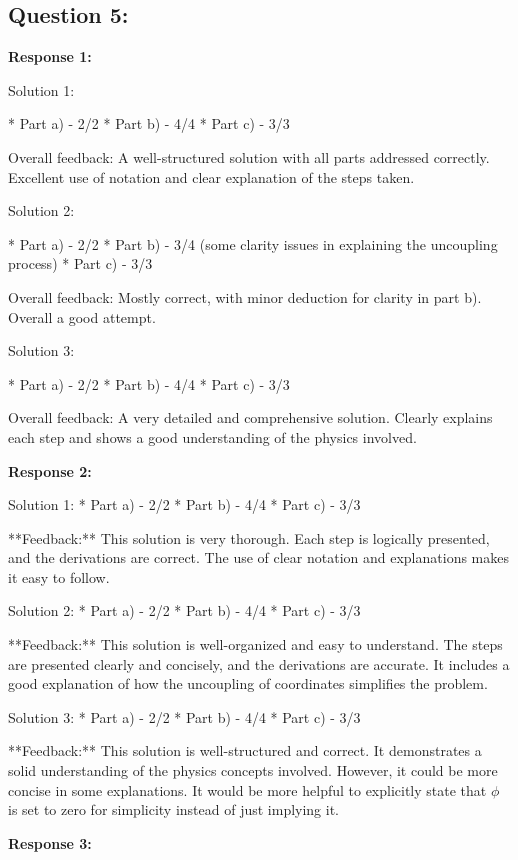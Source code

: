 \documentclass[a4paper,11pt]{article}
\begin{document}
\subsection*{Question 5:}

\textbf{Response 1:}

Solution 1:

*   Part a) - 2/2
*   Part b) - 4/4
*   Part c) - 3/3

Overall feedback: A well-structured solution with all parts addressed correctly. Excellent use of notation and clear explanation of the steps taken.

Solution 2:

*   Part a) - 2/2
*   Part b) - 3/4 (some clarity issues in explaining the uncoupling process)
*   Part c) - 3/3

Overall feedback: Mostly correct, with minor deduction for clarity in part b). Overall a good attempt.

Solution 3:

*   Part a) - 2/2
*   Part b) - 4/4
*   Part c) - 3/3

Overall feedback: A very detailed and comprehensive solution. Clearly explains each step and shows a good understanding of the physics involved.

\bigskip    
\textbf{Response 2:}

Solution 1:
*   Part a) - 2/2
*   Part b) - 4/4
*   Part c) - 3/3

**Feedback:** This solution is very thorough. Each step is logically presented, and the derivations are correct. The use of clear notation and explanations makes it easy to follow.

Solution 2:
*   Part a) - 2/2
*   Part b) - 4/4
*   Part c) - 3/3

**Feedback:** This solution is well-organized and easy to understand. The steps are presented clearly and concisely, and the derivations are accurate. It includes a good explanation of how the uncoupling of coordinates simplifies the problem.

Solution 3:
*   Part a) - 2/2
*   Part b) - 4/4
*   Part c) - 3/3

**Feedback:** This solution is well-structured and correct. It demonstrates a solid understanding of the physics concepts involved. However, it could be more concise in some explanations. It would be more helpful to explicitly state that \( \phi \) is set to zero for simplicity instead of just implying it.

\bigskip    
\textbf{Response 3:}
\end{document}
